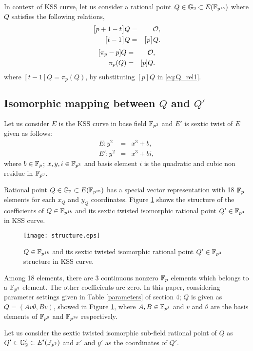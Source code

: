 In context of KSS curve, let us consider a rational point $Q\in {\mathbb{G}}_{2} \subset E({\mathbb{F}}_{p^{18}})$ where $Q$ satisfies the following relations,
\begin{eqnarray}\label{eq:Q_rel1}
\big[p+1-t\big]Q & = & \cal O, \nonumber \\
\big[t-1\big]Q  & = & \big[p\big]Q.
\end{eqnarray}
\begin{eqnarray}\label{eq:Q_rel2}
[\pi_p -p]Q & = &\cal O, \nonumber \\
\pi_p(Q) & = & [p]Q.
\end{eqnarray}
where  $[t-1]Q = \pi_p(Q)$, by substituting $[p]Q$ in \eqref{eq:Q_rel1}.


\subsection{Isomorphic mapping between $Q$ and $Q'$}
Let us consider $E$ is the KSS curve in base field $\mathbb{F}_{p^3}$  and $E'$ is sextic twist of $E$ given as follows: 
\begin{eqnarray}
E:y^2 & = &x^3+b,\\
E':y^2 & = & x^3+bi, \label{eq:KSS_Twist}
\end{eqnarray}
where $b \in {\mathbb{F}}_{p}$; $x, y, i \in \mathbb{F}_{p^3}$ and basis element $i$ is the quadratic and cubic non residue in $\mathbb{F}_{p^3}$.

Rational point $Q\in {\mathbb{G}}_{2} \subset E({\mathbb{F}}_{p^{18}})$ has a  special vector representation with 18 ${\mathbb{F}}_{p}$ elements for each $x_Q$ and $y_Q$ coordinates.
Figure \ref{fig:Q_structure} shows the structure of the coefficients of $Q \in \mathbb{F}_{p^{18}}$ and its sextic twisted isomorphic rational point $Q' \in \mathbb{F}_{p^3}$ in KSS curve.
\begin{figure}[!htb]
\centering
\texttt{[image: structure.eps]}
\caption{ $Q \in \mathbb{F}_{p^{18}}$ and its sextic twisted isomorphic rational point $Q' \in \mathbb{F}_{p^3}$ structure in KSS curve.}
\label{fig:Q_structure}
\end{figure}
Among 18 elements, there are 3 continuous nonzero ${\mathbb{F}}_{p}$ elements which belongs to a $\mathbb{F}_{p^3}$ element. The other coefficients are zero.
In this paper, considering parameter settings given in Table \ref{parameters} of section 4; $Q$ is given as $Q = (Av\theta, Bv)$,  showed in Figure \ref{fig:Q_structure}, where $A, B \in \mathbb{F}_{p^3}$ and $v$ and $\theta$ are the basis elements of ${\mathbb{F}}_{p^{6}}$ and $\mathbb{F}_{p^{18}}$ respectively. 

Let us consider the sextic twisted isomorphic sub-field rational point of $Q$ as $Q' \in {\mathbb{G}}_{2}' \subset E'({\mathbb{F}}_{p^{3}})$ and $x'$ and $y'$ as the coordinates of $Q'$.

